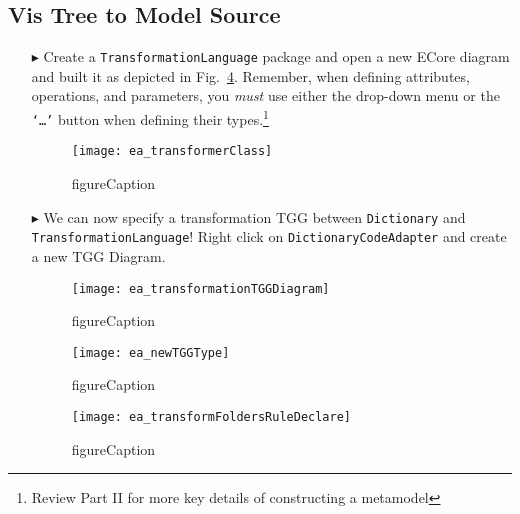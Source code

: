 \newpage
\hypertarget{treeToModel vis}{}
\subsection{Vis Tree to Model Source}
\visHeader

\begin{itemize}

\item[$\blacktriangleright$] Create a \texttt{TransformationLanguage} package and open a new ECore diagram and built it as depicted in
Fig.~\ref{ea:transformerclass}. Remember, when defining attributes, operations, and parameters, you \emph{must} use either the drop-down menu or the
\texttt{`\ldots'} button when defining their types.\footnote{Review Part II for more key details of constructing a metamodel}

\begin{figure}[htpb]
\begin{center}
  \texttt{[image: ea\_transformerClass]}
  \caption{figureCaption}
  \label{ea:transformerclass}
\end{center}
\end{figure}

\item[$\blacktriangleright$] We can now specify a transformation TGG between \texttt{Dictionary} and \texttt{TransformationLanguage}! Right click on
\texttt{DictionaryCodeAdapter} and create a new TGG Diagram.

\begin{figure}[htpb]
\begin{center}
  \texttt{[image: ea\_transformationTGGDiagram]}
  \caption{figureCaption}
  \label{ea:transformerclass}
\end{center}
\end{figure}

\begin{figure}[htpb]
\begin{center}
  \texttt{[image: ea\_newTGGType]}
  \caption{figureCaption}
  \label{ea:transformerclass}
\end{center}
\end{figure}

\begin{figure}[htpb]
\begin{center}
  \texttt{[image: ea\_transformFoldersRuleDeclare]}
  \caption{figureCaption}
  \label{ea:transformerclass}
\end{center}
\end{figure}


\end{itemize}
